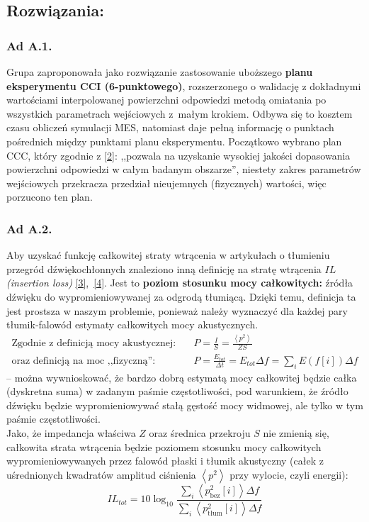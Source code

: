 \documentclass{sprawozdanie-agh}
\begin{document}
\subsection{Rozwiązania:}
\subsubsection{Ad A.1.}
Grupa zaproponowała jako rozwiązanie zastosowanie uboższego \textbf{planu eksperymentu CCI (6-punktowego)}, rozszerzonego o walidację z dokładnymi wartościami interpolowanej powierzchni odpowiedzi metodą omiatania po wszystkich parametrach wejściowych z~małym krokiem. Odbywa się to kosztem czasu obliczeń symulacji MES, natomiast daje pełną informację o punktach pośrednich między punktami planu eksperymentu. Początkowo wybrano plan CCC, który zgodnie z \hyperref[ref2]{[2]}: ,,pozwala na uzyskanie wysokiej jakości dopasowania powierzchni odpowiedzi w całym badanym obszarze'', niestety zakres parametrów wejściowych przekracza przedział nieujemnych (fizycznych) wartości, więc porzucono ten plan.
\subsubsection{Ad A.2.} Aby uzyskać funkcję całkowitej straty wtrącenia w artykułach o tłumieniu przegród dźwiękochłonnych znaleziono inną definicję na stratę wtrącenia $IL$ \textit{(insertion loss)} \hyperref[ref3]{[3]},~\hyperref[ref4]{[4]}. Jest to \textbf{poziom stosunku mocy całkowitych:} źródła dźwięku do wypromieniowywanej za odgrodą tłumiącą. Dzięki temu, definicja ta jest prostsza w naszym problemie, ponieważ należy wyznaczyć dla każdej pary tłumik-falowód estymaty całkowitych mocy akustycznych.
\begin{align*}
    \textrm{Zgodnie z definicją mocy akustycznej:}\quad&P=\tfrac{I}{S}=\tfrac{\left\langle p^2\right\rangle}{Z S}\\
    \textrm{oraz definicją na moc ,,fizyczną'':}\quad&P=\tfrac{E_{tot}}{\Delta t}=E_{tot}\Delta f=\textstyle\sum\nolimits_i E(f[i]) \Delta f
\end{align*}
-- można wywnioskować, że bardzo dobrą estymatą mocy całkowitej będzie całka (dyskretna suma) w zadanym paśmie częstotliwości, pod warunkiem, że źródło dźwięku będzie wypromieniowywać stałą gęstość mocy widmowej, ale tylko w tym paśmie częstotliwości.\\ Jako, że impedancja właściwa $Z$ oraz średnica przekroju $S$ nie zmienią się, całkowita strata wtrącenia będzie poziomem stosunku mocy całkowitych wypromieniowywanych przez falowód płaski i tłumik akustyczny (całek z uśrednionych kwadratów amplitud ciśnienia $\left\langle p^2\right\rangle$ przy wylocie, czyli energii):
\vspace{-0.7cm}
\begin{equation}
     \boxed{IL_{tot} = 10\log_{10}{\frac{\sum_i \left\langle p_{\textrm{bez}}^2[i] \right\rangle\Delta f}{\sum_i \left\langle p_{\textrm{tłum}}^2[i]\right\rangle \Delta f}}  }
     \label{eq}
\end{equation}
\end{document}
